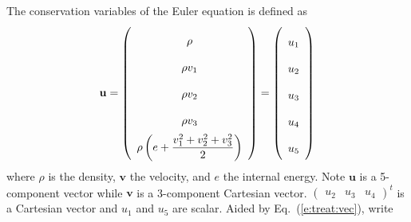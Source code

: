 \documentclass[a4paper,12pt,dvips]{article}
\begin{document}
The conservation variables of the Euler equation is defined as
\begin{align*}
  \renewcommand{\arraystretch}{2}
  \mathbf{u} = \left(\begin{array}{c}
    \rho \\ \rho v_1 \\ \rho v_2 \\ \rho v_3 \\
    \rho\left(e + \dfrac{v_1^2+v_2^2+v_3^2}{2}\right)
  \end{array}\right)
  = \left(\begin{array}{c}
    u_1 \\ u_2 \\ u_3 \\ u_4 \\ u_5
  \end{array}\right)
\end{align*}
where $\rho$ is the density, $\mathbf{v}$ the velocity, and $e$ the internal
energy.  Note $\mathbf{u}$ is a 5-component vector while $\mathbf{v}$ is a
3-component Cartesian vector.  $\left(\begin{array}{ccc} u_2 & u_3 & u_4
\end{array}\right)^t$ is a Cartesian vector and $u_1$ and $u_5$ are scalar.
%
Aided by Eq.~(\ref{e:treat:vec}), write
\end{document}
